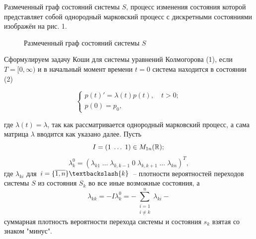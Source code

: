 \documentclass[14pt,a4paper]{scrartcl}
\begin{document}
Размеченный граф состояний системы $S$, процесс изменения состояния которой представляет собой однородный марковский процесс с дискретными состояниями изображён на рис. 1. 


\begin{figure}[H]
	\begin{minipage}[h]{1\linewidth}
		\caption{Размеченный граф состояний системы $S$\\}  
	\end{minipage}
\end{figure}



Сформулируем задачу Коши для системы уравнений Колмогорова (1), если $T = [0, \infty)$ и в начальный момент времени $t = 0$ система находится в состоянии (2)

\begin{equation}
	\begin{cases}
		p(t)' = \lambda(t)p(t), \quad t > 0;\\
		p(0) = p_0,
	\end{cases}
\end{equation}

где $\lambda(t) = \lambda$, так как рассматривается однородный марковский процесс, а сама матрица $\lambda$ вводится как указано далее. Пусть
\begin{equation*}
	I = (1 \; \ldots \; 1) \in M_{1n}(\mathbb{R});\\
\end{equation*} 
\begin{equation*}
	\lambda_k^0 = (\lambda_{k1} \; \ldots \; \lambda_{k,k-1} \; 0 \; \lambda_{k,k+1} \; \ldots \; \lambda_{kn})^T,
\end{equation*}
где $\lambda_{ki}$ для $i=\{\overline{1,n}\} \textbackslash \{k\}$ -- плотности вероятностей переходов системы $S$ из состояния $S_k$ во все иные возможные состояния, а
\begin{equation*}
	\lambda_{kk} = -I\lambda_k^0 = - \sum\limits_{\substack{i=1\\i\neq k}}^n \lambda_{ki} -
\end{equation*}
суммарная плотность вероятности перехода системы и состояния $s_k$ взятая со знаком "минус".
\end{document}
